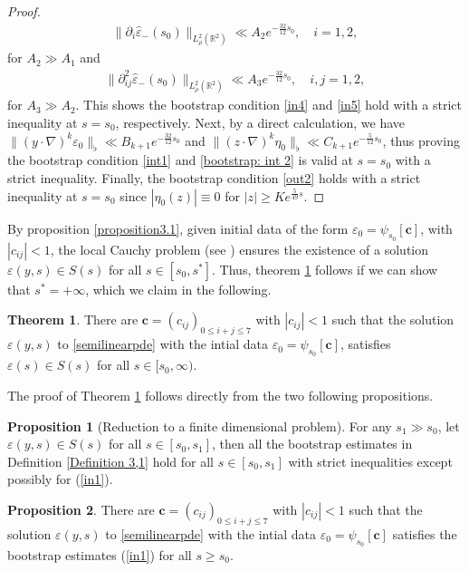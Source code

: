 \documentclass[11pt,reqno]{amsart}
\theoremstyle{definition}
\newtheorem{theorem}{Theorem}[section]
\theoremstyle{bfremark}
\newtheorem{proposition}{Proposition}[section]
\numberwithin{equation}{section}
\newcommand{\veph}{\hat\varepsilon }
\begin{document}
\begin{proof}
\begin{align*}
    \|\partial_i\veph_-(s_0)\|_{L^2_{\rho}(\mathbb{R}^2)}  \ll A_2 e^{-\frac{32}{12}s_0}, \quad i=1,2,
\end{align*}
for \(A_2 \gg A_1\) and  
\begin{align*}
     \|\partial^2_{ij}\veph_-(s_0)\|_{L^2_{\rho}(\mathbb{R}^2)}  \ll A_3 e^{-\frac{32}{12}s_0}, \quad i,j=1,2,
\end{align*}
for \(A_3 \gg A_2\). This shows the bootstrap condition \ref{in4} and \ref{in5} hold with a strict inequality at \(s=s_0\), respectively. Next, by a direct calculation, we have \(\|(y \cdot \nabla)^k \varepsilon_0\|_{\flat} \ll B_{k+1}e^{-\frac{32}{12}s_0}\) and \(\|(z \cdot \nabla)^k \eta_0\|_{\flat} \ll C_{k+1}e^{-\frac{5}{12}s_0}\), thus proving the bootstrap condition \ref{int1} and \ref{bootstrap: int 2} is valid at \(s=s_0\) with a strict inequality. Finally, the bootstrap condition \ref{out2} holds with a strict inequality at \(s=s_0\) since \(|\eta_0(z)| \equiv
0\) for \(|z| \geq Ke^{\frac{5}{49}s}\).
\end{proof} 

By proposition \ref{proposition3.1}, given initial data of the form 
 \(\varepsilon_0=\psi_{s_0}[\textbf{c}]\), with \(|c_{ij}|<1\), the local Cauchy problem (see \cite{kavallaris2018non}) ensures the existence of a solution  \(\varepsilon(y,s)\in S(s)\) for all \(s \in [s_0,s^*]\). Thus, theorem \ref{Theorem3.1} follows if we can show that 
\(s^*=+\infty\), which we claim in the following.

\begin{theorem}
\label{Theorem3.1} There are $\mathbf{c} = (c_{ij})_{0 \leq i+j \leq 7}$ with \(|c_{ij}|<1\) such that the solution $\varepsilon(y,s)$ to \eqref{semilinearpde} with the intial data \(\varepsilon_0=\psi_{s_0}[\textbf{c}]\), satisfies \(\varepsilon(s) \in S(s)\) for all \(s \in [s_0,\infty)\).
\end{theorem}
The proof of Theorem \ref{Theorem3.1} follows directly from the two following propositions.
\begin{proposition}[Reduction to a finite dimensional problem]
\label{Proposition3.2}
For any \(s_1 \gg s_0\), let \(\varepsilon(y,s)\in S(s)\) for all \(s \in [s_0,s_1]\), then all the bootstrap estimates in Definition \ref{Definition 3,1} hold for all \(s \in [s_0,s_1]\) with strict inequalities except possibly for (\ref{in1}).
\end{proposition}

\begin{proposition}
\label{Proposition3.3}
There are $\mathbf{c} = (c_{ij})_{0 \leq i+j \leq 7}$ with \(|c_{ij}|<1\) such that the solution $\varepsilon(y,s)$ to \eqref{semilinearpde} with the intial data \(\varepsilon_0=\psi_{s_0}[\textbf{c}]\) satisfies the bootstrap estimates (\ref{in1}) for all $s \geq s_0$. 
\end{proposition}
    
\end{document}
